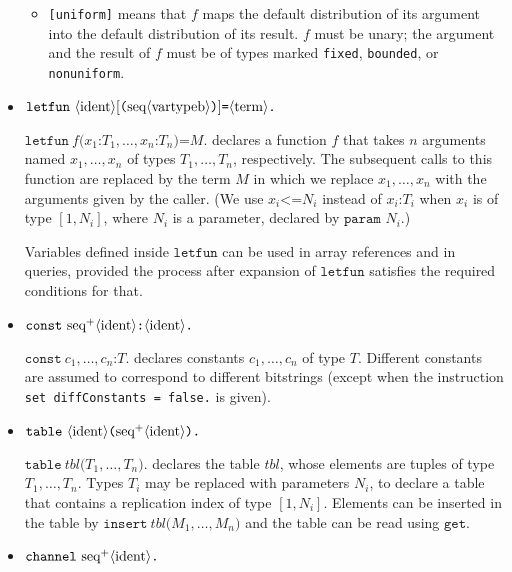 \begin{itemize}
\begin{itemize}
\item \texttt{[uniform]} means that $f$ maps the default distribution
of its argument into the default distribution of its result. $f$ must be unary;
the argument and the result of $f$ must be of types marked 
{\tt fixed}, {\tt bounded}, or {\tt nonuniform}.

\end{itemize}

\item $\texttt{letfun}\
  \langle\textrm{ident}\rangle[\texttt{(}\textrm{seq}\langle\textrm{vartypeb}\rangle\texttt{)}]\texttt{=}\langle\textrm{term}\rangle\texttt{.}$ 

  $\texttt{letfun}\ f\texttt{(} x_1\texttt{:} T_1, \ldots,
  x_n\texttt{:}T_n\texttt{)=} M\texttt{.}$
  declares a function $f$ that takes $n$ arguments named
  $x_1, \ldots, x_n$ of types $T_1, \ldots, T_n$, respectively. The
  subsequent calls to this function are replaced by the term $M$ in
  which we replace $x_1, \ldots, x_n$ with the arguments given by the
  caller. (We use $x_i \texttt{<=} N_i$ instead of
  $x_i\texttt{:} T_i$ when $x_i$ is of type $[1,N_i]$, where $N_i$ is
  a parameter, declared by $\texttt{param }N_i$.)

  Variables defined inside $\texttt{letfun}$ can be used in array references
  and in queries, provided the process after expansion of $\texttt{letfun}$
  satisfies the required conditions for that.

\item $\texttt{const}\ \neseq{ident}\texttt{:}\nonterm{ident}\texttt{.}$

$\texttt{const}\ c_1, \ldots, c_n\texttt{:}T\texttt{.}$ declares constants
$c_1, \ldots, c_n$ of type $T$.
Different constants are assumed to correspond to different bitstrings
(except when the instruction \texttt{set diffConstants = false.} is
given).

\item $\texttt{table}\ \nonterm{ident}\texttt{(}\neseq{ident}\texttt{).}$

$\texttt{table}\ \mathit{tbl}\texttt{(}T_1, \ldots, T_n\texttt{).}$
declares the table $\mathit{tbl}$, whose elements are tuples of
type $T_1, \ldots, T_n$. Types $T_i$ may be replaced with
parameters $N_i$, to declare a table that contains
a replication index of type $[1,N_i]$. Elements can be inserted in the table
by $\texttt{insert}\ \mathit{tbl}\texttt{(}M_1, \ldots, M_n\texttt{)}$
and the table can be read using $\texttt{get}$.

\ifchannels
\item $\texttt{channel}\ \neseq{ident}\texttt{.}$


\end{itemize}
